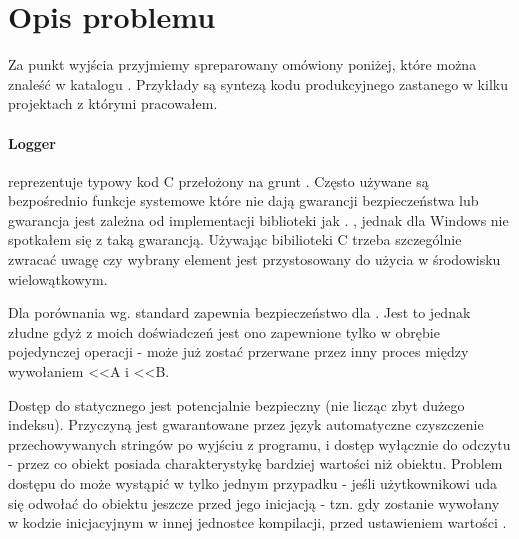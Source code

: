\section{Opis problemu}\label{sec:problem-desc}
Za punkt wyjścia przyjmiemy spreparowany omówiony poniżej, które można znaleść w katalogu  . Przykłady są syntezą kodu produkcyjnego zastanego w kilku projektach z którymi pracowałem. 

\paragraph{Logger}
 reprezentuje typowy kod C przełożony na grunt \Cpp{}.
Często używane są bezpośrednio funkcje systemowe które nie dają gwarancji bezpieczeństwa lub gwarancja jest zależna od implementacji biblioteki jak . , jednak dla Windows nie spotkałem się z taką gwarancją. Używając bibilioteki C trzeba szczególnie zwracać uwagę czy wybrany element jest przystosowany do użycia w środowisku wielowątkowym.

Dla porównania wg.  standard zapewnia bezpieczeństwo dla . Jest to jednak złudne gdyż z moich doświadczeń jest ono zapewnione tylko w obrębie pojedynczej operacji -  może już zostać przerwane przez inny proces między wywołaniem <<A i <<B.

Dostęp do statycznego  jest potencjalnie bezpieczny (nie licząc zbyt dużego indeksu). Przyczyną jest gwarantowane przez język automatyczne czyszczenie przechowywanych stringów po wyjściu z programu, i dostęp wyłącznie do odczytu - przez co obiekt posiada charakterystykę bardziej wartości niż obiektu. Problem dostępu do  może wystąpić w tylko jednym przypadku - jeśli użytkownikowi uda się odwołać do obiektu jeszcze przed jego inicjacją - tzn. gdy  zostanie wywołany w kodzie inicjacyjnym w innej jednostce kompilacji, przed ustawieniem wartości .

